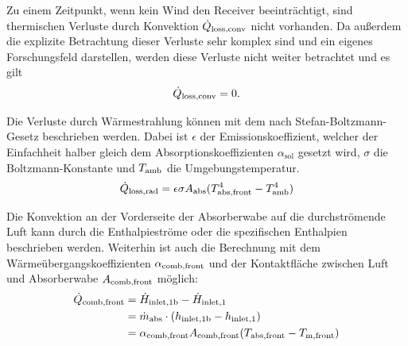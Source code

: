 Zu einem Zeitpunkt, wenn kein Wind den Receiver beeinträchtigt, sind thermischen Verluste durch Konvektion $\dot{Q}_{\mathrm{loss,conv}}$ nicht vorhanden.
Da außerdem die explizite Betrachtung dieser Verluste sehr komplex sind und ein eigenes Forschungsfeld darstellen, werden diese Verluste nicht weiter betrachtet \cite{IdingSolarPaces} und es gilt
\begin{equation} \label{eq_KonvektiveVerluste}
\dot{Q}_{\mathrm{loss,conv}} = 0.
\end{equation}

Die Verluste durch Wärmestrahlung können mit dem nach Stefan-Boltzmann-Gesetz beschrieben werden.
Dabei ist $\epsilon$ der Emissionskoeffizient, welcher der Einfachheit halber gleich dem Absorptionskoeffizienten $\alpha_{\mathrm{sol}}$ gesetzt wird, $\sigma$ die Boltzmann-Konstante und $T_{\mathrm{amb}}$ die Umgebungstemperatur.
\begin{equation} \label{eq_StrahlungVerluste}
    \dot{Q}_{\mathrm{loss,rad}} = \epsilon \sigma A_{\mathrm{abs}} (T_{\mathrm{abs,front}}^4-T_{\mathrm{amb}}^4)
\end{equation}

Die Konvektion an der Vorderseite der Absorberwabe auf die durchströmende Luft kann durch die Enthalpieströme oder die spezifischen Enthalpien beschrieben werden.
Weiterhin ist auch die Berechnung mit dem Wärmeübergangskoeffizienten $\alpha_{\mathrm{comb},\mathrm{front}}$ und der Kontaktfläche zwischen Luft und Absorberwabe $A_{\mathrm{comb},\mathrm{front}}$ möglich:
\begin{equation} \label{eq_gewünschteKonvektion}
    \begin{aligned}
        \dot{Q}_{\mathrm{comb,front}} & = \dot{H}_{\mathrm{inlet,}\mathrm{1b}} - \dot{H}_{\mathrm{inlet,}1}                                              \\
                               & = \dot{m}_{\mathrm{abs}} \cdot ( h_{\mathrm{inlet,}\mathrm{1b}} - h_{\mathrm{inlet,}1})            \\
                               & = \alpha_{\mathrm{comb},\mathrm{front}} A_{\mathrm{comb},\mathrm{front}} (T_{\mathrm{abs,front}}-T_{\mathrm{m,front}})
    \end{aligned}
\end{equation}

